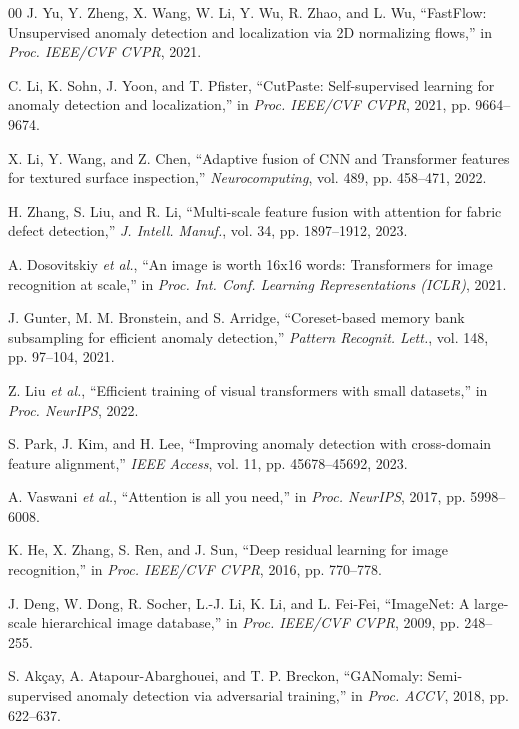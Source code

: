 \documentclass[journal]{IEEEtran}
\begin{document}
\begin{thebibliography}{00}
J. Yu, Y. Zheng, X. Wang, W. Li, Y. Wu, R. Zhao, and L. Wu, ``FastFlow: Unsupervised anomaly detection and localization via 2D normalizing flows,'' in \textit{Proc. IEEE/CVF CVPR}, 2021.

C. Li, K. Sohn, J. Yoon, and T. Pfister, ``CutPaste: Self-supervised learning for anomaly detection and localization,'' in \textit{Proc. IEEE/CVF CVPR}, 2021, pp. 9664--9674.

X. Li, Y. Wang, and Z. Chen, ``Adaptive fusion of CNN and Transformer features for textured surface inspection,'' \textit{Neurocomputing}, vol. 489, pp. 458--471, 2022.

H. Zhang, S. Liu, and R. Li, ``Multi-scale feature fusion with attention for fabric defect detection,'' \textit{J. Intell. Manuf.}, vol. 34, pp. 1897--1912, 2023.

A. Dosovitskiy \textit{et al.}, ``An image is worth 16x16 words: Transformers for image recognition at scale,'' in \textit{Proc. Int. Conf. Learning Representations (ICLR)}, 2021.

J. Gunter, M. M. Bronstein, and S. Arridge, ``Coreset-based memory bank subsampling for efficient anomaly detection,'' \textit{Pattern Recognit. Lett.}, vol. 148, pp. 97--104, 2021.

Z. Liu \textit{et al.}, ``Efficient training of visual transformers with small datasets,'' in \textit{Proc. NeurIPS}, 2022.

S. Park, J. Kim, and H. Lee, ``Improving anomaly detection with cross-domain feature alignment,'' \textit{IEEE Access}, vol. 11, pp. 45678--45692, 2023.

A. Vaswani \textit{et al.}, ``Attention is all you need,'' in \textit{Proc. NeurIPS}, 2017, pp. 5998--6008.

K. He, X. Zhang, S. Ren, and J. Sun, ``Deep residual learning for image recognition,'' in \textit{Proc. IEEE/CVF CVPR}, 2016, pp. 770--778.

J. Deng, W. Dong, R. Socher, L.-J. Li, K. Li, and L. Fei-Fei, ``ImageNet: A large-scale hierarchical image database,'' in \textit{Proc. IEEE/CVF CVPR}, 2009, pp. 248--255.

S. Ak\c{c}ay, A. Atapour-Abarghouei, and T. P. Breckon, ``GANomaly: Semi-supervised anomaly detection via adversarial training,'' in \textit{Proc. ACCV}, 2018, pp. 622--637.


\end{thebibliography}
\end{document}
